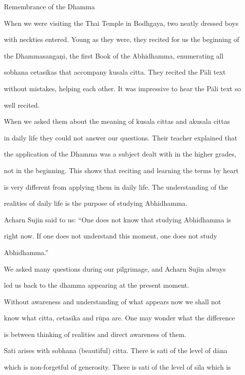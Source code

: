 Remembrance of the Dhamma 



When we were visiting the Thai Temple in Bodhgaya, two neatly dressed boys  

with neckties entered. Young as they were, they recited for us the beginning of  

the   Dhammasangaṇi,   the   first   Book   of   the   Abhidhamma,   enumerating   all  

sobhana   cetasikas   that   accompany   kusala   citta.   They   recited   the   Pāli   text  

without mistakes, helping each other. It was impressive to hear the Pāli text so  

well recited. 

   When we asked them about the meaning of kusala cittas and akusala cittas  

in daily life they could not answer our questions. Their teacher explained that  

the application of the Dhamma was a subject dealt with in the higher grades,  

not in the beginning. This shows that reciting and learning the terms by heart  

is very  different  from  applying  them  in  daily  life.  The  understanding  of  the  

realities of daily life is the purpose of studying Abhidhamma. 



Acharn  Sujin  said  to  us:  “One  does  not  know  that  studying Abhidhamma  is  

right   now.   If   one   does   not   understand   this   moment,   one   does   not   study  

Abhidhamma.” 

   We asked many questions during our pilgrimage,  and Acharn  Sujin  always  

led us back to the dhamma appearing at the present moment. 

   Without  awareness  and  understanding  of what  appears  now we  shall  not  

know what citta, cetasika and rūpa are. One may wonder what the difference  

is between thinking of realities and direct awareness of them. 

   Sati  arises with  sobhana  (beautiful) citta. There is sati of the level of dāna  

which is non-forgetful of generosity. There is sati of the level of sīla which is  

